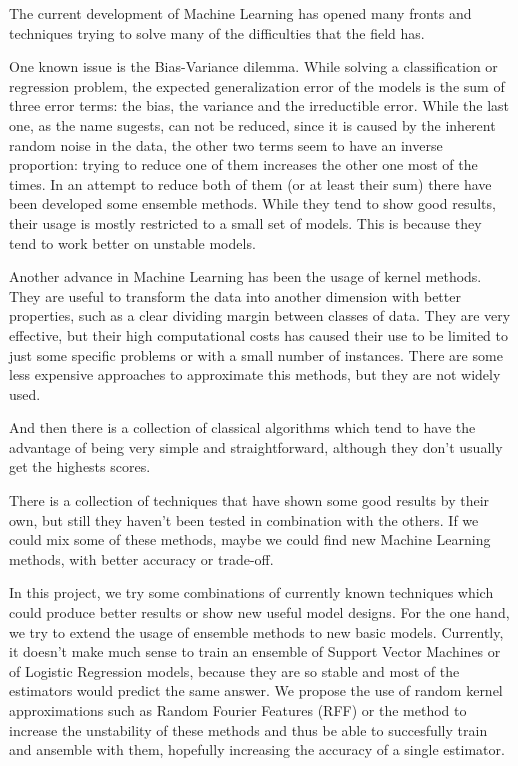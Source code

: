 \begin{pre-delivery}
  The current development of Machine Learning has opened many fronts and
  techniques trying to solve many of the difficulties that the field has.

  One known issue is the Bias-Variance dilemma. While solving a classification
  or regression problem, the expected generalization error of the models is the
  sum of three error terms: the bias, the variance and the irreductible error.
  While the last one, as the name sugests, can not be reduced, since it is
  caused by the inherent random noise in the data, the other two terms seem
  to have an inverse proportion: trying to reduce one of them increases the
  other one most of the times. In an attempt to reduce both of them (or at
  least their sum) there have been developed some ensemble methods. While they
  tend to show good results, their usage is mostly restricted to a small set of
  models. This is because they tend to work better on unstable
  models.

  Another advance in Machine Learning has been the usage of kernel methods. They
  are useful to transform the data into another dimension with better properties,
  such as a clear dividing margin between classes of data. They are very
  effective, but their high computational costs has caused their use to be limited to just
  some specific problems or with a small number of instances. There are some
  less expensive approaches to approximate this methods, but they are not
  widely used.

  And then there is a collection of classical algorithms which tend to have the
  advantage of being very simple and straightforward, although they don't
  usually get the highests scores.

  There is a collection of techniques that have shown some good results by their
  own, but still they haven't been tested in combination with the others. If we
  could mix some of these methods, maybe we could find new Machine Learning
  methods, with better accuracy or trade-off.

  In this project, we try some combinations of currently known techniques which
  could produce better results or show new useful model designs. For the one
  hand, we try to extend the usage of ensemble methods to new basic models.
  Currently, it doesn't make much sense to train an ensemble of Support Vector
  Machines or of Logistic Regression models, because they are so stable and
  most of the estimators would predict the same answer. We propose the use of
  random kernel approximations such as Random Fourier Features (RFF) or the
  \Nys method to increase the unstability of these methods and thus be able to
  succesfully train and ansemble with them, hopefully increasing the accuracy
  of a single estimator.


\end{pre-delivery}
